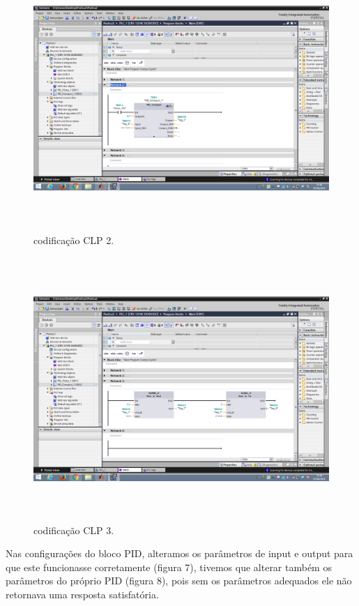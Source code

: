\documentclass[12pt,a4paper]{article}
\begin{document}
\begin{figure}[H]
	\centering
	\caption{codificação CLP 2.}
	\label{fig:5}	
	\includegraphics[height=10cm]{figuras/network2_clp.png} %
\end{figure}

\begin{figure}[H]
	\centering
	\caption{codificação CLP 3.}
	\label{fig:6}	
	\includegraphics[height=10cm]{figuras/network3_clp.png} %
\end{figure}

Nas configurações do bloco PID, alteramos os parâmetros de input e output para que este funcionasse corretamente (figura 7), tivemos que alterar também os parâmetros do próprio PID (figura 8), pois sem os parâmetros adequados ele não retornava uma resposta satisfatória.
\end{document}
